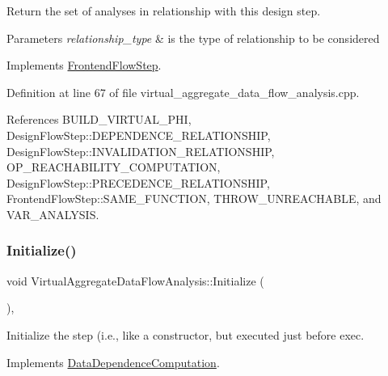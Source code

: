 Return the set of analyses in relationship with this design step. 


\begin{DoxyParams}{Parameters}
{\em relationship\+\_\+type} & is the type of relationship to be considered \\
\hline
\end{DoxyParams}


Implements \hyperlink{classFrontendFlowStep_abeaff70b59734e462d347ed343dd700d}{Frontend\+Flow\+Step}.



Definition at line 67 of file virtual\+\_\+aggregate\+\_\+data\+\_\+flow\+\_\+analysis.\+cpp.



References B\+U\+I\+L\+D\+\_\+\+V\+I\+R\+T\+U\+A\+L\+\_\+\+P\+HI, Design\+Flow\+Step\+::\+D\+E\+P\+E\+N\+D\+E\+N\+C\+E\+\_\+\+R\+E\+L\+A\+T\+I\+O\+N\+S\+H\+IP, Design\+Flow\+Step\+::\+I\+N\+V\+A\+L\+I\+D\+A\+T\+I\+O\+N\+\_\+\+R\+E\+L\+A\+T\+I\+O\+N\+S\+H\+IP, O\+P\+\_\+\+R\+E\+A\+C\+H\+A\+B\+I\+L\+I\+T\+Y\+\_\+\+C\+O\+M\+P\+U\+T\+A\+T\+I\+ON, Design\+Flow\+Step\+::\+P\+R\+E\+C\+E\+D\+E\+N\+C\+E\+\_\+\+R\+E\+L\+A\+T\+I\+O\+N\+S\+H\+IP, Frontend\+Flow\+Step\+::\+S\+A\+M\+E\+\_\+\+F\+U\+N\+C\+T\+I\+ON, T\+H\+R\+O\+W\+\_\+\+U\+N\+R\+E\+A\+C\+H\+A\+B\+LE, and V\+A\+R\+\_\+\+A\+N\+A\+L\+Y\+S\+IS.

\mbox{\label{classVirtualAggregateDataFlowAnalysis_acafa9a90b201923d66a16fea72ccc9ac}} 
\subsubsection{\texorpdfstring{Initialize()}{Initialize()}}
{\footnotesize\ttfamily void Virtual\+Aggregate\+Data\+Flow\+Analysis\+::\+Initialize (\begin{DoxyParamCaption}{ }\end{DoxyParamCaption})\hspace{0.3cm}{\ttfamily [override]}, {\ttfamily [virtual]}}



Initialize the step (i.\+e., like a constructor, but executed just before exec. 



Implements \hyperlink{classDataDependenceComputation_adeeabf6602796c390b4e331e553c71b9}{Data\+Dependence\+Computation}.



